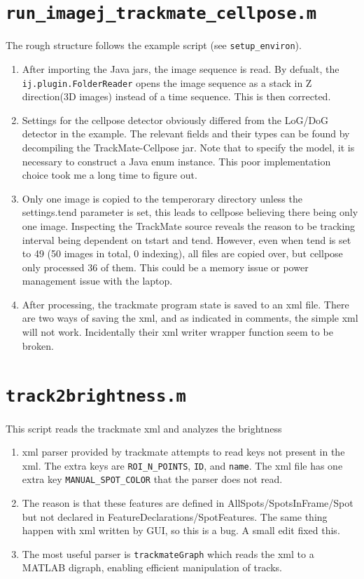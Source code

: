 \documentclass[11pt]{article}
\begin{document}
\section{\texttt{run\_imagej\_trackmate\_cellpose.m}}
\label{sec:org6f26772}
The rough structure follows the example script (see \texttt{setup\_environ}).
\begin{enumerate}
\item After importing the Java jars, the image sequence is read. By defualt, the \texttt{ij.plugin.FolderReader} opens the image sequence as a stack in Z direction(3D images) instead of a time sequence. This is then corrected.
\item Settings for the cellpose detector obviously differed from the LoG/DoG detector in the example. The relevant fields and their types can be found by decompiling the TrackMate-Cellpose jar. Note that to specify the model, it is necessary to construct a Java enum instance. This poor implementation choice took me a long time to figure out.
\item Only one image is copied to the temperorary directory unless the settings.tend parameter is set, this leads to cellpose believing there being only one image. Inspecting the TrackMate source reveals the reason to be tracking interval being dependent on tstart and tend. However, even when tend is set to 49 (50 images in total, 0 indexing), all files are copied over, but cellpose only processed 36 of them. This could be a memory issue or power management issue with the laptop.
\item After processing, the trackmate program state is saved to an xml file. There are two ways of saving the xml, and as indicated in comments, the simple xml will not work. Incidentally their xml writer wrapper function seem to be broken.
\end{enumerate}
\section{\texttt{track2brightness.m}}
\label{sec:org7af4e90}
This script reads the trackmate xml and analyzes the brightness
\begin{enumerate}
\item xml parser provided by trackmate attempts to read keys not present in the xml. The extra keys are \texttt{ROI\_N\_POINTS}, \texttt{ID}, and \texttt{name}. The xml file has one extra key \texttt{MANUAL\_SPOT\_COLOR} that the parser does not read.
\item The reason is that these features are defined in AllSpots/SpotsInFrame/Spot but not declared in FeatureDeclarations/SpotFeatures. The same thing happen with xml written by GUI, so this is a bug. A small edit fixed this.
\item The most useful parser is \texttt{trackmateGraph} which reads the xml to a MATLAB digraph, enabling efficient manipulation of tracks.
\end{enumerate}
\end{document}
